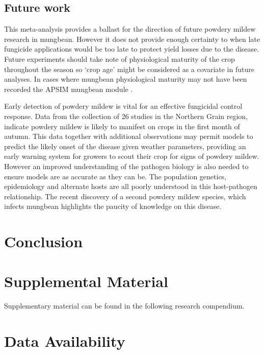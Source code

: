 \documentclass[agronomy,article,submit,moreauthors,pdftex]{mdpi}
\begin{document}
\hypertarget{future-work}{%
\subsection{Future work}\label{future-work}}

This meta-analysis provides a ballast for the direction of future powdery mildew research in mungbean.
However it does not provide enough certainty to when late fungicide applications would be too late to protect yield losses due to the disease.
Future experiments should take note of physiological maturity of the crop throughout the season so `crop age' might be considered as a covariate in future analyses.
In cases where mungbean physiological maturity may not have been recorded the APSIM mungbean module \citep{RobertsonAPSIMlegume2002}.

Early detection of powdery mildew is vital for an effective fungicidal control response.
Data from the collection of 26 studies in the Northern Grain region, indicate powdery mildew is likely to manifest on crops in the first month of autumn.
This data together with additional observations may permit models to predict the likely onset of the disease given weather parameters, providing an early warning system for growers to scout their crop for signs of powdery mildew.
However an improved understanding of the pathogen biology is also needed to ensure models are as accurate as they can be.
The population genetics, epidemiology and alternate hosts are all poorly understood in this host-pathogen relationship.
The recent discovery of a second powdery mildew species, which infects mungbean highlights the paucity of knowledge on this disease.

\hypertarget{conclusion}{%
\section{Conclusion}\label{conclusion}}

\hypertarget{supplemental-material}{%
\section{Supplemental Material}\label{supplemental-material}}

Supplementary material can be found in the following research compendium.

\hypertarget{data-availability}{%
\section{Data Availability}\label{data-availability}}
\end{document}
